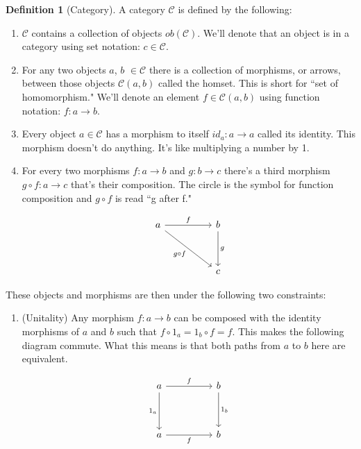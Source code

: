 \documentclass{article}
\theoremstyle{definition}
\newtheorem{definition}{Definition}
\begin{document}
\begin{definition}[Category]
    A category $\mathcal{C}$ is defined by the following:
    \begin{enumerate}
        \item $\mathcal{C}$ contains a collection of objects $ob(\mathcal{C})$. We'll denote that an object is in a category using set notation: $c\in\mathcal{C}$.
        \item For any two objects $a$, $b$ $\in \mathcal{C}$ there is a collection of morphisms, or arrows, between those objects $\mathcal{C}(a,b)$ called the homset. This is short for ``set of homomorphism." We'll denote an element $f\in\mathcal{C}(a,b)$ using function notation: $f:a\rightarrow b$.
        \item Every object $a\in \mathcal{C}$ has a morphism to itself $id_a:a\rightarrow a$ called its identity. This morphism doesn't do anything. It's like multiplying a number by 1.
        \item For every two morphisms $f:a\rightarrow b$ and $g: b\rightarrow c$ there's a third morphism $g\circ f:a\rightarrow c$ that's their composition. The circle is the symbol for function composition and $g \circ f$ is read ``g after f."

              \[\begin{tikzcd}
                      a && b \\
                      \\
                      && c
                      \arrow["f", from=1-1, to=1-3]
                      \arrow["g", from=1-3, to=3-3]
                      \arrow["{g\circ f}"', from=1-1, to=3-3]
                  \end{tikzcd}\]

    \end{enumerate}
    These objects and morphisms are then under the following two constraints:
    \begin{enumerate}
        \item (Unitality) Any morphism $f:a\rightarrow b$ can be composed with the identity morphisms of $a$ and $b$ such that $f\circ 1_a=1_b\circ f=f$. This makes the following diagram commute. What this means is that both paths from $a$ to $b$ here are equivalent.

              \[\begin{tikzcd}
                      a && b \\
                      \\
                      a && b
                      \arrow["f", from=1-1, to=1-3]
                      \arrow["{1_a}"', from=1-1, to=3-1]
                      \arrow["{1_b}", from=1-3, to=3-3]
                      \arrow["f"', from=3-1, to=3-3]
                  \end{tikzcd}\]


\end{enumerate}
\end{definition}
\end{document}
